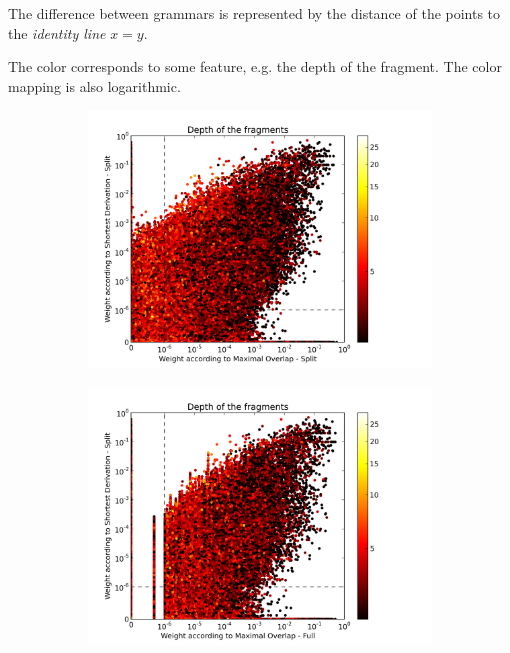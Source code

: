 The difference between grammars is represented by the distance of the points to the \emph{identity line} $x=y$.

The color corresponds to some feature, e.g. the depth of the fragment. The color mapping is also logarithmic. 

\begin{figure}
\center
\begin{subfigure}{0.32\textwidth}
\includegraphics[width=\linewidth,trim=0.5cm 0cm 2.5cm 0.5cm, clip=true]{../data/plots/0.png}
\label{f:SDS-MOS}
\end{subfigure}
\begin{subfigure}{0.32\textwidth}
\includegraphics[width=\linewidth,trim=0.5cm 0cm 2.5cm 0.5cm, clip=true]{../data/plots/1.png}

\end{subfigure}
\end{figure}
